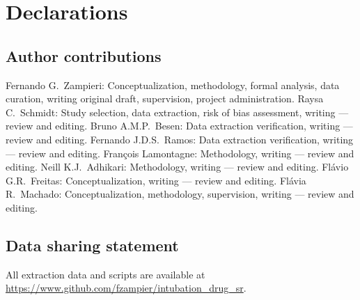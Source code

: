 \documentclass[11pt]{article}
\begin{document}
\newpage

\section*{Declarations}

\subsection*{Author contributions}
Fernando G.\ Zampieri: Conceptualization, methodology, formal analysis, data curation, writing original draft, supervision, project administration.
Raysa C.\ Schmidt: Study selection, data extraction, risk of bias assessment, writing --- review and editing.
Bruno A.M.P.\ Besen: Data extraction verification, writing --- review and editing.
Fernando J.D.S.\ Ramos: Data extraction verification, writing --- review and editing.
Fran\c{c}ois Lamontagne: Methodology, writing --- review and editing.
Neill K.J.\ Adhikari: Methodology, writing --- review and editing.
Fl\'avio G.R.\ Freitas: Conceptualization, writing --- review and editing.
Fl\'avia R.\ Machado: Conceptualization, methodology, supervision, writing --- review and editing.

\subsection*{Data sharing statement}
All extraction data and scripts are available at \url{https://www.github.com/fzampier/intubation_drug_sr}.
\end{document}
